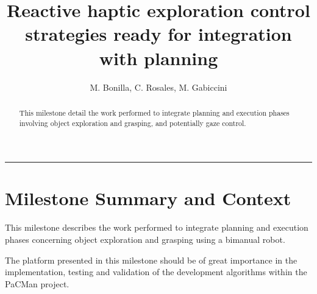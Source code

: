 \documentclass[a4paper,11pt,pdf]{pacmanreport}
\title{Reactive haptic exploration control strategies ready for integration with planning}
\author{M. Bonilla, C. Rosales, M. Gabiccini}
\begin{document}
\maketitle

\begin{abstract}
\noindent This milestone detail the work performed to integrate planning and execution phases involving object exploration and grasping, and potentially gaze control. 
\end{abstract}


\vspace{.2em}
\hrule

\vspace{.2em}
\footnotesize

\tableofcontents

\normalsize

\newpage

\section{Milestone Summary and Context}

This milestone describes the work performed to integrate planning and execution phases concerning object exploration and grasping using a bimanual robot.



The platform presented in this milestone should be of great importance in the implementation, testing and validation of the development algorithms within the PaCMan project.


\end{document}
